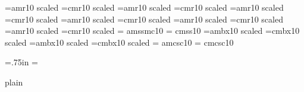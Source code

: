 \ifamrfonts \font\brm=amr10 scaled  
      \else \font\brm=cmr10 scaled  \fi 
\ifamrfonts \font\halfrm=amr10 scaled \magstephalf 
      \else \font\halfrm=cmr10 scaled \magstephalf \fi 
\ifamrfonts \font\bbrm=amr10 scaled  
      \else \font\bbrm=cmr10 scaled  \fi 
\ifamrfonts \font\bbbrm=amr10 scaled  
      \else \font\bbbrm=cmr10 scaled  \fi 
\ifamrfonts \font\bbbbrm=amr10 scaled  
      \else\font \bbbbrm=cmr10 scaled  \fi 
\ifamrfonts \font\bbbbbrm=amr10 scaled  
      \else \font\bbbbbrm=cmr10 scaled  \fi 
\ifamrfonts \font\sf = amssmc10 
      \else \font\sf = cmss10 \fi 
\ifamrfonts \font\chapfont=ambx10 scaled  
      \else \font\chapfont=cmbx10 scaled  \fi 
\ifamrfonts \font\secfont=ambx10 scaled  
      \else \font\secfont=cmbx10 scaled  \fi 
\ifamrfonts \font\sc= amcsc10 
      \else \font\sc= cmcsc10 \fi 
 
 
\raggedbottom      %
\hsize=5.5in 
\vsize=7in 
\voffset=.75in 
\parskip=\baselineskip 
{}   %
 
\newif \ifcanspell 
\canspelltrue      %
 
\def\aesthetic{\ifcanspell \ae{}sthetic\else esthetic\fi} 
\def\analogue{\ifcanspell analogue\else analog\fi} 
     \let\analog=\analogue 
\def\cancelled{\ifcanspell cancelled\else canceled\fi} 
     \let\canceled=\cancelled 
\def\centimetre{\ifcanspell centimetre\else centimeter\fi} 
     \let\centimeter=\centimetre 
\def\centre{\ifcanspell centre\else center\fi} 
     \let\center=\centre 
\def\centred{\ifcanspell centred\else centered\fi} 
     \let\centered=\centred 
\def\our{\ifcanspell our\else or\fi} 
\def\postcode{\ifcanspell postalcode\else zipcode\fi} 
\def\province{\ifcanspell province\else state\fi} 
\def\theatre{\ifcanspell theatre\else theater\fi} 
     \let\theater=\theatre 
 

\def\shouldbefmt{plain}
\ifx\shouldbefmt\fmtname
\else
\immediate{}
\immediate{}
\immediate{}
\immediate{}
\immediate{}
\immediate{}
\immediate{}
\fi

